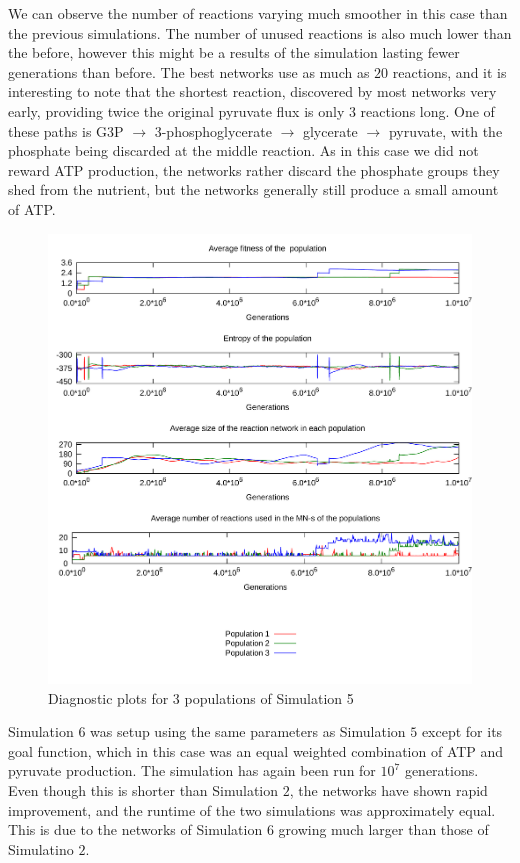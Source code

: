 \documentclass[a4paper,12pt]{article}
\begin{document}
We can observe the number of reactions varying much smoother in this case than the previous simulations. The number of unused reactions is also much lower than the before, however this might be a results of the simulation lasting fewer generations than before.  The best networks use as much as $20$ reactions, and it is interesting to note that the shortest reaction, discovered by most networks very early, providing twice the original pyruvate flux is only $3$ reactions long. One of these paths is G3P $\rightarrow$ 3-phosphoglycerate $\rightarrow$ glycerate $\rightarrow$ pyruvate, with the phosphate being discarded at the middle reaction. 
As in this case we did not reward ATP production, the networks rather discard the phosphate groups they shed from the nutrient, but the networks generally still produce a small amount of ATP. 


\begin{figure}[htpb]
	\centering
	\includegraphics[width=0.8\linewidth]{simulationpyruvonly.pdf}
	\caption{Diagnostic plots for 3 populations of Simulation 5}
	\label{fig:simulationpyruvonly}
\end{figure}

Simulation $6$ was setup using the same parameters as Simulation $5$ except for its goal function, which in this case was an equal weighted combination of ATP and pyruvate production. The simulation has again been run for $10^7$ generations. Even though this is shorter than Simulation $2$, the networks have shown rapid  improvement, and the runtime of the two simulations was approximately equal. This is due to the networks of Simulation $6$ growing much larger than those of Simulatino $2$. 
\end{document}
